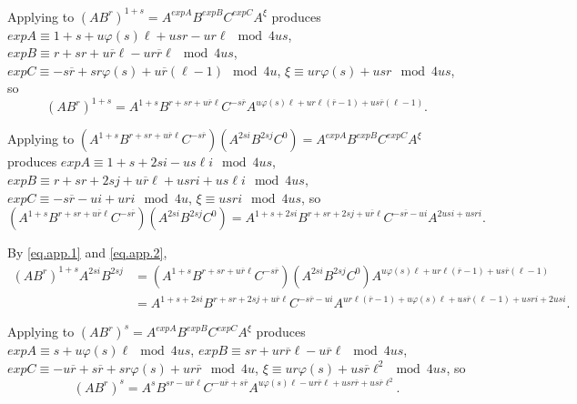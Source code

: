 \documentclass{amsart}
\theoremstyle{definition}
\theoremstyle{remark}
\begin{document}
Applying \cite[Theorem 3.5]{MS3} to
$(AB^r)^{1+s} = A^{expA} B^{expB} C^{expC} A^{\xi}$ produces
$expA\equiv 1 + s + u\varphi(s)\ell + usr - ur\ell\mod 4us$,
$expB\equiv r + sr + u\overline{r}\ell - ur\overline{r}\ell\mod 4us$,
$expC\equiv -s\overline{r} + sr\varphi(s) + u\overline{r}(\ell - 1)\mod 4u$,
$\xi\equiv ur\varphi(s) + usr\mod 4us$, so
\begin{equation}\label{eq.app.1}
    (AB^r)^{1+s}
    = A^{1 + s} B^{r + sr + u\overline{r}\ell} C^{-s\overline{r}} A^{u\varphi(s)\ell + ur\ell(\overline{r} - 1) + us\overline{r}(\ell - 1)}.
\end{equation}

Applying \cite[Theorem 3.2]{MS3} to
$(A^{1 + s} B^{r + sr + u\overline{r}\ell} C^{-s\overline{r}}) (A^{2si} B^{2sj} C^0) = A^{expA} B^{expB} C^{expC} A^{\xi}$ produces
$expA\equiv 1 + s + 2si - us\ell i\mod 4us$,
$expB\equiv r + sr + 2sj + u\overline{r}\ell + usri + us\ell i\mod 4us$,
$expC\equiv -s\overline{r} - ui + uri\mod 4u$, $\xi\equiv usri\mod 4us$, so
\begin{equation}\label{eq.app.2}
    (A^{1 + s} B^{r + sr + u\overline{r}\ell} C^{-s\overline{r}}) (A^{2si} B^{2sj} C^0)
    = A^{1 + s + 2si} B^{r + sr + 2sj + u\overline{r}\ell} C^{-s\overline{r} - ui} A^{2usi + usri}.
\end{equation}

By \eqref{eq.app.1} and \eqref{eq.app.2},
\begin{equation}\label{eq.imp.1}
    \begin{split}
        (AB^r)^{1+s} A^{2si} B^{2sj}
        &= (A^{1 + s} B^{r + sr + u\overline{r}\ell} C^{-s\overline{r}}) (A^{2si} B^{2sj} C^0) A^{u\varphi(s)\ell + ur\ell(\overline{r} - 1) + us\overline{r}(\ell - 1)}\\
        &= A^{1 + s + 2si} B^{r + sr + 2sj + u\overline{r}\ell} C^{-s\overline{r} - ui} A^{ur\ell(\overline{r} - 1) + u\varphi(s)\ell + us\overline{r}(\ell - 1) + usri + 2usi}.
    \end{split}
\end{equation}

Applying \cite[Theorem 3.5]{MS3} to
$(AB^r)^s = A^{expA} B^{expB} C^{expC} A^{\xi}$ produces
$expA\equiv s + u\varphi(s)\ell\mod 4us$,
$expB\equiv sr + ur\overline{r}\ell - u\overline{r}\ell\mod 4us$,
$expC\equiv -u\overline{r} + s\overline{r} + sr\varphi(s) + ur\overline{r}\mod 4u$,
$\xi\equiv ur\varphi(s) + us\overline{r}\ell^2\mod 4us$, so
\begin{equation}\label{eq.app.3}
    (AB^r)^s
    = A^s B^{sr - u\overline{r}\ell} C^{-u\overline{r} + s\overline{r}} A^{u\varphi(s)\ell - ur\overline{r}\ell + usr\overline{r} + us\overline{r}\ell^2}.
\end{equation}
\end{document}
